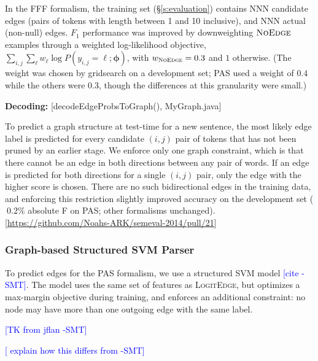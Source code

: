 \documentclass[11pt]{article}
\newcommand{\bocomment}[1]{\textcolor{Bittersweet}{[#1 -BTO]}}
\newcommand{\sam}[1]{\textcolor{blue}{[#1 -SMT]}}
\newcommand{\codenote}[1]{\textcolor{PineGreen}{[#1]}}
\newcommand{\logitedge}{\textsc{LogitEdge}}
\newcommand{\noedge}{\textsc{NoEdge}}
\begin{document}
In the FFF formalism, the training set (\S\ref{s:evaluation})
contains NNN candidate edges (pairs of tokens with length between 1 and 10 inclusive),
and NNN actual (non-null) edges.  $F_1$ performance was improved by
downweighting $\noedge$ examples through a weighted log-likelihood objective,
$\sum_{i,j} \sum_\ell w_\ell \log P(y_{i,j}=\ell; \bm\phi)$, with $w_{\noedge}=0.3$
and $1$ otherwise.
(The weight was chosen by gridsearch on a development set; 
PAS used a weight of $0.4$ while the others were $0.3$, though the differences at this granularity were small.)



\textbf{Decoding:}
\codenote{decodeEdgeProbsToGraph(), MyGraph.java}

To predict a graph structure at test-time for a new sentence,
the most likely edge label is predicted for every candidate $(i, j)$ pair of
tokens that has not been pruned by an earlier stage.
We enforce only one graph constraint, which is that there cannot be
an edge in both directions between any pair of words.
If an edge is predicted for both directions for a single $(i, j)$
pair, only the edge with the higher score is chosen.
There are no such bidirectional edges in the training data, and enforcing this
restriction slightly improved accuracy on the development set ($~0.2\%$ absolute F on PAS; other formalisms unchanged).\codenote{\url{https://github.com/Noahs-ARK/semeval-2014/pull/21}}


\subsubsection{Graph-based Structured SVM Parser} \label{s:graphparser}

To predict edges for the PAS formalism, we use a structured SVM model
\sam{cite}.
The model uses the same set of features as \logitedge, but optimizes a
max-margin objective during training, and enforces an additional constraint: no
node may have more than one outgoing edge with the same label.

\sam{TK from jflan}

\sam{
explain how this differs from 
\cite{flanigan-etal:ACL2014}
}
\end{document}
